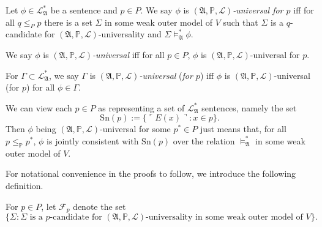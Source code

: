 \documentclass[12pt]{article}
\numberwithin{equation}{section}
\begin{document}
\begin{defi}
Let $\phi \in \mathcal{L}^{*}_{\mathfrak{A}}$ be a sentence and $p \in P$. We say $\phi$ is $(\mathfrak{A}, \mathbb{P}, \mathcal{L})$\emph{-universal for $p$} iff for all $q \leq_P p$ there is a set $\Sigma$ in some weak outer model of $V$ such that $\Sigma$ is a $q$-candidate for $(\mathfrak{A}, \mathbb{P}, \mathcal{L})$-universality and $\Sigma \models^*_{\mathfrak{A}} \phi$.

We say $\phi$ is $(\mathfrak{A}, \mathbb{P}, \mathcal{L})$\emph{-universal} iff for all $p \in P$, $\phi$ is $(\mathfrak{A}, \mathbb{P}, \mathcal{L})$-universal for $p$. 

For $\Gamma \subset \mathcal{L}^{*}_{\mathfrak{A}}$, we say $\Gamma$ is $(\mathfrak{A}, \mathbb{P}, \mathcal{L})$\emph{-universal} (\emph{for $p$}) iff $\phi$ is $(\mathfrak{A}, \mathbb{P}, \mathcal{L})$-universal (for $p$) for all $\phi \in \Gamma$.
\end{defi}

\begin{rem}\label{rem341}
We can view each $p \in P$ as representing a set of $\mathcal{L}^{*}_{\mathfrak{A}}$ sentences, namely the set
\begin{equation*}
    \mathrm{Sn}(p) := \{\ulcorner E(x) \urcorner : x \in p\} \text{.}
\end{equation*}
Then $\phi$ being $(\mathfrak{A}, \mathbb{P}, \mathcal{L})$-universal for some $p^* \in P$ just means that, for all $p \leq_{\mathbb{P}} p^*$, $\phi$ is jointly consistent with $\mathrm{Sn}(p)$ over the relation $\models^{*}_{\mathfrak{A}}$ in some weak outer model of $V$.
\end{rem}

For notational convenience in the proofs to follow, we introduce the following definition.

\begin{defi}
For $p \in P$, let $\mathcal{F}_p$ denote the set 
\begin{equation*}
    \{\Sigma : \Sigma \text{ is a } p \text{-candidate for } (\mathfrak{A}, \mathbb{P}, \mathcal{L}) \text{-universality in some weak outer model of } V\}.
\end{equation*}
\end{defi}
\end{document}
